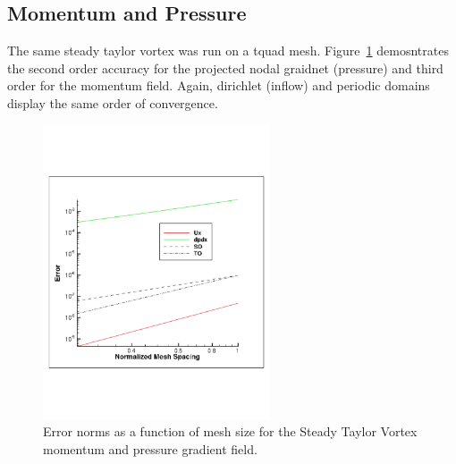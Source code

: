 \subsection{Momentum and Pressure}
The same steady taylor vortex was run on a tquad mesh. Figure~\ref{fig:hoSTVMMS} demosntrates the second
order accuracy for the projected nodal graidnet (pressure) and third order for the momentum field. 
Again, dirichlet (inflow) and periodic domains display the same order of convergence.

\begin{figure}
\centerline{\includegraphics[width=0.6\textwidth]{figures/ho_stvUandDpDx.pdf}}
\caption{Error norms as a function of mesh size for the Steady Taylor Vortex momentum and pressure gradient field.}
\label{fig:hoSTVMMS}
\end{figure}
